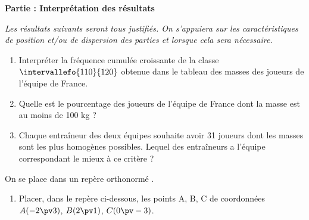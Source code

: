 \documentclass[12pt,french,oneside]{report}
\begin{document}
\begin{spacing}{1.2}
\begin{Exercice}[(10,5 points)]
\textbf{Partie  : Interprétation des résultats}

\begin{center}
\textit{Les résultats suivants seront tous justifiés. On s'appuiera sur les caractéristiques de position et/ou de dispersion des parties  et  lorsque cela sera nécessaire.}
\end{center}

\begin{enumerate}

\item %
Interpréter la fréquence cumulée croissante de la classe $\intervallefo{110}{120}$ obtenue dans le tableau des masses des joueurs de l'équipe de France.

\item %
Quelle est le pourcentage des joueurs de l'équipe de France dont la masse est au moins de 100 kg ?

\item Chaque entraîneur des deux équipes souhaite avoir 31 joueurs dont les masses sont les plus homogènes possibles. Lequel des entraîneurs a l'équipe correspondant le mieux à ce critère ?


\end{enumerate}


\end{Exercice}

\bigskip
\begin{Exercice}[(7,5 points)]%

\medskip

On se place dans un repère orthonormé \OIJ. 




\begin{enumerate}
\item Placer, dans le repère ci-dessous, les points A, B, C de coordonnées $A(-2\pv 3)$, $B(2\pv 1)$, $C(0\pv -3)$.


\end{enumerate}
\end{Exercice}
\end{spacing}
\end{document}
